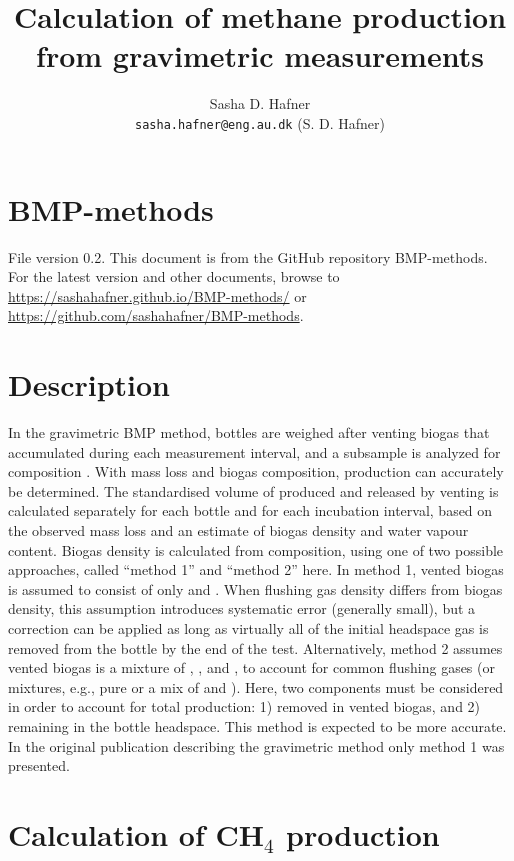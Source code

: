 \documentclass[]{article}
\title {Calculation of methane production from gravimetric measurements}
\author{Sasha D. Hafner
\\
\texttt{sasha.hafner@eng.au.dk} (S. D. Hafner)\\
}
\begin{document}
\maketitle

\section{BMP-methods}
File version 0.2. 
This document is from the GitHub repository BMP-methods.
For the latest version and other documents, browse to \url{https://sashahafner.github.io/BMP-methods/} or \url{https://github.com/sashahafner/BMP-methods}.

\section{Description}
In the gravimetric BMP method, bottles are weighed after venting biogas that accumulated during each measurement interval, and a subsample is analyzed for composition \cite{validation}.
With mass loss and biogas composition,  production can accurately be determined.
The standardised volume of  produced and released by venting is calculated separately for each bottle and for each incubation interval, based on the observed mass loss and an estimate of biogas density and water vapour content. 
Biogas density is calculated from composition, using one of two possible approaches, called ``method 1'' and ``method 2'' here.
In method 1, vented biogas is assumed to consist of only  and . 
When flushing gas density differs from biogas density, this assumption introduces systematic error (generally small), but a correction can be applied as long as virtually all of the initial headspace gas is removed from the bottle by the end of the test. 
Alternatively, method 2 assumes vented biogas is a mixture of , , and , to account for common flushing gases (or mixtures, e.g., pure  or a mix of  and ).
Here, two components must be considered in order to account for total  production: 1)  removed in vented biogas, and 2)  remaining in the bottle headspace.
This method is expected to be more accurate.
In the original publication describing the gravimetric method \cite{validation} only method 1 was presented.

\section{Calculation of CH$_4$ production}
\end{document}
